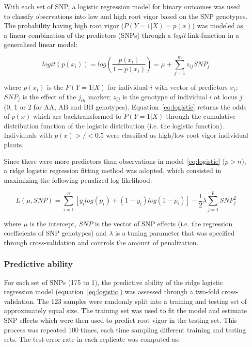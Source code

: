With each set of SNP, a logistic regression model for binary outcomes
was used to classify observations into low and high root vigor based on
the SNP genotypes. The probability having high root vigor ($P(Y=1|X)=p(x)$) was modeled as a linear
combination of the predictors (SNPs) through a \emph{logit}
link-function in a generalised linear model:

\begin{equation} \label{eq:logistic}
logit(p(x_i)) = log \left ( \frac{p(x_i)}{1-p(x_i)} \right ) = \mu +
\sum_{j=1}^m z_{ij} SNP_j
\end{equation}
 
where $p(x_i)$ is the $P(Y=1|X)$ for individual $i$ with vector of
predictors $x_i$; $SNP_j$ is the effect of the $j_{th}$ marker; $z_{ij}$
is the genotype of individual $i$ at locus $j$ (0, 1 or 2 for AA, AB and
BB genotypes).
Equation~\ref{eq:logistic} returns the odds of $p(x)$ which are
backtransformed to $P(Y=1|X)$ through the cumulative
distribution function of the logistic distribution (i.e. the logistic
function). Individuals with $p(x)>/<0.5$ were classified as high/low
root vigor individual plants.

Since there were more predictors than observations in
model~\ref{eq:logistic} ($p>n$), a ridge logistic regression fitting method
\cite{liu2011multilocus} was adopted, which consisted in maximizing the following
penalized log-likelihood:

\begin{equation}
L(\mu,SNP)=\sum_{i=1}^n
[y_ilog(p_i)+(1-y_i)log(1-p_i)]-\frac{1}{2}\lambda\sum_{j=1}^p SNP_j^2
\end{equation}

where $\mu$ is the intercept, $SNP$ is the vector of SNP effects (i.e. the
regression coefficients of SNP genotypes) and $\lambda$ is a tuning
parameter that was specified through cross-validation and controls the
amount of penalization.

\subsubsection{Predictive ability}
\label{par:estimating_error}
For each set of SNPs (175 to 1), the predictive ability of
the ridge logistic regression model (equation~\ref{eq:logistic}) was assessed
through a two-fold cross-validation. 
The 123 samples were randomly split into a training and testing set of approximately equal
size. The training set was used to fit the model and estimate SNP
effects which were then used to predict root vigor in the testing set. This process was repeated 100
times, each time sampling different training and testing sets.  
The test error rate in each replicate was computed as:

